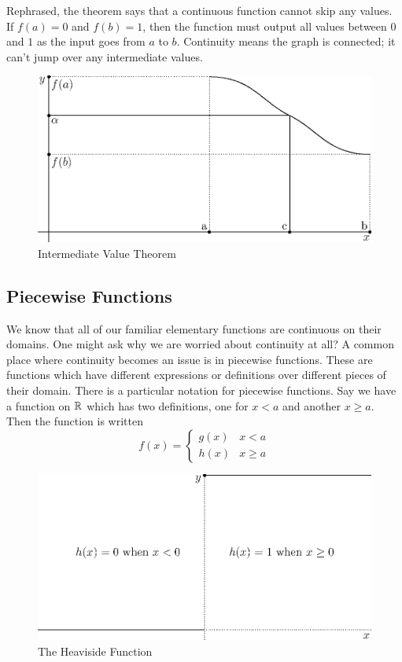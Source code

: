 \documentclass[fleqn]{report}
\begin{document}
Rephrased, the theorem says that a continuous function cannot
skip any values. If $f(a) = 0$ and $f(b) = 1$, then the
function must output all values between $0$ and $1$ as the
input goes from $a$ to $b$. Continuity means the graph is
connected; it can't jump over any intermediate values.

\begin{figure}[t]
\centering
\includegraphics[width=12cm]{figure46.eps}
\caption{Intermediate Value Theorem}
\label{figure-ivt}
\end{figure}

\subsection{Piecewise Functions}
\label{piecewise}

We know that all of our familiar elementary functions are
continuous on their domains. One might ask why we are worried
about continuity at all? A common place where continuity
becomes an issue is in piecewise functions. These are
functions which have different expressions or definitions over
different pieces of their domain. There is a particular
notation for piecewise functions. Say we have a function on
$\mathbb{R}$ which has two definitions, one for $x<a$ and another $x
\geq a$. Then the function is written
\begin{equation*}
f(x) = \left\{ \begin{matrix} g(x) & x < a \\ h(x) & x \geq a
\end{matrix} \right.
\end{equation*}

\begin{figure}[ht]
\centering
\includegraphics[width=12cm]{figure21.eps}
\caption{The Heaviside Function}
\label{figure-heaviside}
\end{figure}
\end{document}
